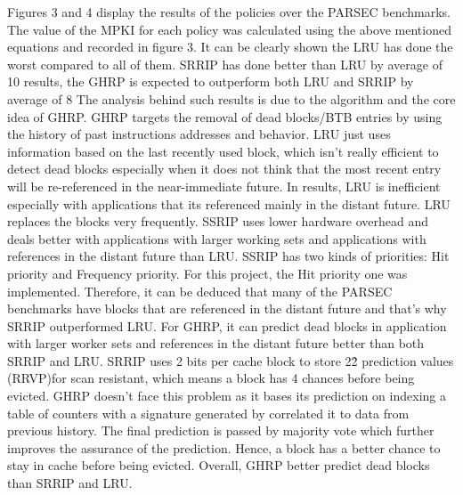 \documentclass[11pt]{article}
\begin{document}
Figures 3 and 4 display the results of the policies over the PARSEC benchmarks. The value of the MPKI for each policy was calculated using the above mentioned equations and
recorded in figure 3. It can be clearly shown the LRU has done the worst compared to all of them. SRRIP has done better than LRU by average of 10%
results, the GHRP is expected to outperform both LRU and SRRIP by average of 8%
The analysis behind such results is due to the algorithm and the core idea of GHRP. GHRP targets the removal of dead blocks/BTB entries by using the history of past 
instructions addresses and behavior. LRU just uses information based on the last recently used block, which isn’t really efficient to detect dead blocks especially when it does
not think that the most recent entry will be re-referenced in
the near-immediate future. In results, LRU is inefficient especially with applications that its referenced mainly in the distant future. LRU replaces the blocks very 
frequently. 
 SSRIP uses lower hardware overhead and deals better with applications with larger working sets and applications with references in the distant future than LRU. SSRIP has two 
kinds of priorities: Hit priority and Frequency priority. For this project, the Hit priority one was implemented. Therefore, it can be deduced that many of the PARSEC 
benchmarks have blocks that are referenced in the distant future and that’s why SRRIP outperformed LRU. For GHRP, it can predict dead blocks in application with larger worker 
sets and references in the distant future better than both SRRIP and LRU. SRRIP uses 2 bits per cache block to store 2\^2 prediction values (RRVP)for scan resistant, which means
a block has 4 chances before being evicted. GHRP doesn’t face this problem as it bases its prediction on indexing a table of counters with a signature generated by correlated 
it to data from previous history. The final prediction is passed by majority vote which further improves the assurance of the prediction. Hence, a block has a better chance to 
stay in cache before being evicted. Overall, GHRP better predict dead blocks than SRRIP and LRU. 
\end{document}
